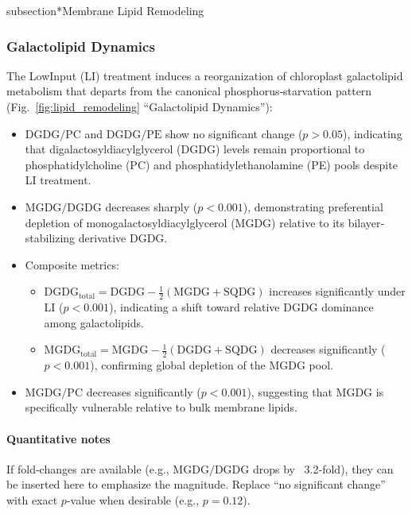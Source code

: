 \documentclass[10pt,letterpaper]{article}
\begin{document}
subsection*{Membrane Lipid Remodeling}

\subsubsection*{Galactolipid Dynamics}

The LowInput (LI) treatment induces a reorganization of chloroplast galactolipid metabolism that departs from the canonical phosphorus‐starvation pattern (Fig.~\ref{fig:lipid_remodeling} “Galactolipid Dynamics”):

\begin{itemize}
  \item \textbf{\(\mathrm{DGDG/PC}\)} and \textbf{\(\mathrm{DGDG/PE}\)} show no significant change (\(p>0.05\)), indicating that digalactosyldiacylglycerol (DGDG) levels remain proportional to phosphatidylcholine (PC) and phosphatidylethanolamine (PE) pools despite LI treatment.
  \item \textbf{\(\mathrm{MGDG/DGDG}\)} decreases sharply (\(p<0.001\)), demonstrating preferential depletion of monogalactosyldiacylglycerol (MGDG) relative to its bilayer‐stabilizing derivative DGDG.
  \item Composite metrics:
    \begin{itemize}
      \item \(\mathrm{DGDG}_{\mathrm{total}} = \mathrm{DGDG} - \tfrac{1}{2}(\mathrm{MGDG} + \mathrm{SQDG})\) increases significantly under LI (\(p<0.001\)), indicating a shift toward relative DGDG dominance among galactolipids.
      \item \(\mathrm{MGDG}_{\mathrm{total}} = \mathrm{MGDG} - \tfrac{1}{2}(\mathrm{DGDG} + \mathrm{SQDG})\) decreases significantly (\(p<0.001\)), confirming global depletion of the MGDG pool.
    \end{itemize}
  \item \textbf{\(\mathrm{MGDG/PC}\)} decreases significantly (\(p<0.001\)), suggesting that MGDG is specifically vulnerable relative to bulk membrane lipids.
\end{itemize}

\paragraph{Quantitative notes}
If fold‐changes are available (e.g., \(\mathrm{MGDG/DGDG}\) drops by ~3.2‐fold), they can be inserted here to emphasize the magnitude. Replace “no significant change” with exact \(p\)-value when desirable (e.g., \(p=0.12\)).
\end{document}
